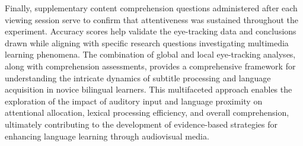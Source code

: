 Finally, supplementary content comprehension questions administered
after each viewing session serve to confirm that attentiveness was
sustained throughout the experiment. Accuracy scores help validate the
eye-tracking data and conclusions drawn while aligning with specific
research questions investigating multimedia learning phenomena. The
combination of global and local eye-tracking analyses, along with
comprehension assessments, provides a comprehensive framework for
understanding the intricate dynamics of subtitle processing and language
acquisition in novice bilingual learners. This multifaceted approach
enables the exploration of the impact of auditory input and language
proximity on attentional allocation, lexical processing efficiency, and
overall comprehension, ultimately contributing to the development of
evidence-based strategies for enhancing language learning through
audiovisual media.







